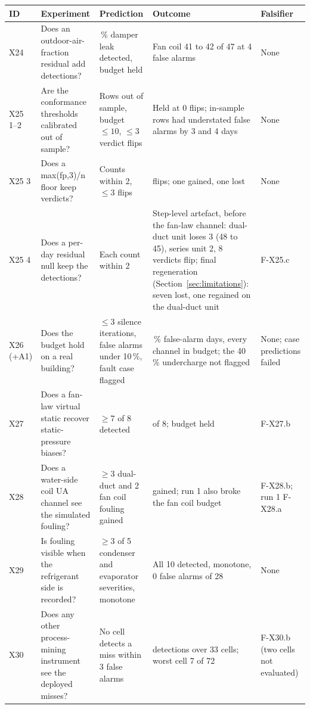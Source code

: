 \documentclass[11pt,letterpaper]{article}
\begin{document}
\begin{table}[p]
\centering
\footnotesize
\setlength{\tabcolsep}{3pt}
\renewcommand{\arraystretch}{1.05}
\begin{tabular}{@{}>{\raggedright\arraybackslash}p{1.1cm}>{\raggedright\arraybackslash}p{4.6cm}>{\raggedright\arraybackslash}p{3.3cm}>{\raggedright\arraybackslash}p{4.3cm}>{\raggedright\arraybackslash}p{2.2cm}@{}}
\hline
ID & Experiment & Prediction & Outcome & Falsifier \\
\hline
X24 & Does an outdoor-air-fraction residual add detections? & 20\,\% damper leak detected, budget held & Fan coil 41 to 42 of 47 at 4 false alarms & None \\
X25 1--2 & Are the conformance thresholds calibrated out of sample? & Rows out of sample, budget $\le 10$, $\le 3$ verdict flips & Held at 0 flips; in-sample rows had understated false alarms by 3 and 4 days & None \\
X25 3 & Does a max(fp,3)/n floor keep verdicts? & Counts within 2, $\le 3$ flips & 2 flips; one gained, one lost & None \\
X25 4 & Does a per-day residual null keep the detections? & Each count within 2 & Step-level artefact, before the fan-law channel: dual-duct unit loses 3 (48 to 45), series unit 2, 8 verdicts flip; final regeneration (Section~\ref{sec:limitations}): seven lost, one regained on the dual-duct unit & F-X25.c \\
X26 (+A1) & Does the budget hold on a real building? & $\le 3$ silence iterations, false alarms under 10\,\%, fault case flagged & 6.1\,\% false-alarm days, every channel in budget; the 40\,\% undercharge not flagged & None; case predictions failed \\
X27 & Does a fan-law virtual static recover static-pressure biases? & $\ge 7$ of 8 detected & 6 of 8; budget held & F-X27.b \\
X28 & Does a water-side coil UA channel see the simulated fouling? & $\ge 3$ dual-duct and 2 fan coil fouling gained & 0 gained; run 1 also broke the fan coil budget & F-X28.b; run 1 F-X28.a \\
X29 & Is fouling visible when the refrigerant side is recorded? & $\ge 3$ of 5 condenser and evaporator severities, monotone & All 10 detected, monotone, 0 false alarms of 28 & None \\
X30 & Does any other process-mining instrument see the deployed misses? & No cell detects a miss within 3 false alarms & 0 detections over 33 cells; worst cell 7 of 72 & F-X30.b (two cells not evaluated) \\

\end{tabular}
\end{table}
\end{document}
